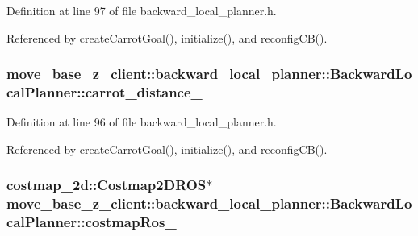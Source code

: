 Definition at line 97 of file backward\+\_\+local\+\_\+planner.\+h.



Referenced by create\+Carrot\+Goal(), initialize(), and reconfig\+C\+B().

\subsubsection[{\texorpdfstring{carrot\+\_\+distance\+\_\+}{carrot_distance_}}]{ move\+\_\+base\+\_\+z\+\_\+client\+::backward\+\_\+local\+\_\+planner\+::\+Backward\+Local\+Planner\+::carrot\+\_\+distance\+\_\+\hspace{0.3cm}{\ttfamily [private]}}\hypertarget{classmove__base__z__client_1_1backward__local__planner_1_1BackwardLocalPlanner_a6dc3aa0ff63f9f7d0aae852755734b5d}{}\label{classmove__base__z__client_1_1backward__local__planner_1_1BackwardLocalPlanner_a6dc3aa0ff63f9f7d0aae852755734b5d}


Definition at line 96 of file backward\+\_\+local\+\_\+planner.\+h.



Referenced by create\+Carrot\+Goal(), initialize(), and reconfig\+C\+B().

\subsubsection[{\texorpdfstring{costmap\+Ros\+\_\+}{costmapRos_}}]{\setlength{\rightskip}{0pt plus 5cm}costmap\+\_\+2d\+::\+Costmap2\+D\+R\+OS$\ast$ move\+\_\+base\+\_\+z\+\_\+client\+::backward\+\_\+local\+\_\+planner\+::\+Backward\+Local\+Planner\+::costmap\+Ros\+\_\+\hspace{0.3cm}{\ttfamily [private]}}\hypertarget{classmove__base__z__client_1_1backward__local__planner_1_1BackwardLocalPlanner_a865618f84238fe6ff437d1e38ec5fec0}{}\label{classmove__base__z__client_1_1backward__local__planner_1_1BackwardLocalPlanner_a865618f84238fe6ff437d1e38ec5fec0}



